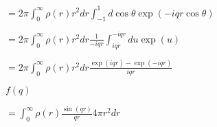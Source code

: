 \documentclass[12pt]{article}
\def\lthtmlcheckvsize{\ifdim\ht\sizebox<\vsize 
  \ifdim\wd\sizebox<\hsize\expandafter\hfill\fi \expandafter\vfill
  \else\expandafter\vss\fi}%
\begin{document}
{\newpage\clearpage
{}%
$\displaystyle =2\pi \int_0^\infty \rho(r) r^2 dr \int_{-1}^1  d\cos\theta  \exp(-i q r
\cos\theta)$%
\lthtmlindisplaymathZ
\lthtmlcheckvsize\clearpage}

{\newpage\clearpage
{}%
$\displaystyle =2\pi \int_0^\infty \rho(r) r^2 dr \frac{1}{-iqr}\int_{iqr}^{-iqr}  du  \exp(u)$%
\lthtmlindisplaymathZ
\lthtmlcheckvsize\clearpage}

{\newpage\clearpage
{}%
$\displaystyle =2\pi \int_0^\infty \rho(r) r^2 dr \frac{\exp(iqr) - \exp(-iqr)}{iqr}$%
\lthtmlindisplaymathZ
\lthtmlcheckvsize\clearpage}

{\newpage\clearpage
{}%
$\displaystyle f(q)$%
\lthtmlindisplaymathZ
\lthtmlcheckvsize\clearpage}

{\newpage\clearpage
{}%
$\displaystyle = \int_0^\infty \rho(r)   \frac{\sin(qr)}{qr}  4\pi r^2 dr$%
\lthtmlindisplaymathZ
\lthtmlcheckvsize\clearpage}
\end{document}
